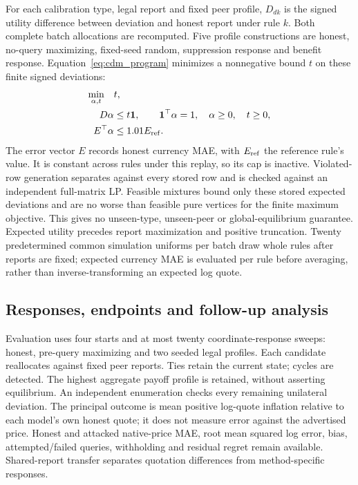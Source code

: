 \documentclass[pdflatex,sn-nature]{sn-jnl}
\begin{document}
For each calibration type, legal report and fixed peer profile, $D_{dk}$ is
the signed utility difference between deviation and honest report under
rule $k$. Both complete batch allocations are recomputed. Five profile
constructions are honest, no-query maximizing, fixed-seed random, suppression
response and benefit response. Equation~\eqref{eq:cdm_program} minimizes
a nonnegative bound $t$ on these finite signed deviations:
\begin{equation}
\begin{aligned}
 \min_{\alpha,t}\quad&t,\\
 D\alpha&\leq t\mathbf1,\qquad\mathbf1^\top\alpha=1,\quad\alpha\geq0,\quad t\geq0,\\
 E^\top\alpha&\leq1.01E_{\rm ref}.
\end{aligned}
 \label{eq:cdm_program}
\end{equation}
The error vector $E$ records honest currency MAE, with $E_{\rm ref}$ the
reference rule's value. It is constant across rules
under this replay, so its cap is inactive. Violated-row generation separates
against every stored row and is checked against an independent full-matrix
LP. Feasible mixtures bound only these stored expected deviations and are
no worse than feasible pure vertices for the finite maximum objective.
This gives no unseen-type, unseen-peer or global-equilibrium guarantee.
Expected utility precedes report maximization and positive truncation.
Twenty predetermined common simulation uniforms per batch draw whole rules
after reports are fixed; expected currency MAE is evaluated per rule before
averaging, rather than inverse-transforming an expected log quote.

\subsection{Responses, endpoints and follow-up analysis}
Evaluation uses four starts and at most twenty coordinate-response sweeps:
honest, pre-query maximizing and two seeded legal profiles. Each candidate
reallocates against fixed peer reports. Ties retain the current state;
cycles are detected. The highest aggregate payoff profile is retained,
without asserting equilibrium. An independent enumeration checks every
remaining unilateral deviation. The principal outcome is mean positive
log-quote inflation relative to each model's own honest quote; it does not
measure error against the advertised price. Honest and attacked native-price
MAE, root mean squared log error, bias, attempted/failed queries, withholding and residual regret
remain available. Shared-report transfer separates quotation differences
from method-specific responses.
\end{document}
